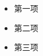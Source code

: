 \documentclass{ctexart}
\begin{document}
  \begin{itemize}
    \item 第一项
    \item 第二项
    \item 第三项
  \end{itemize}
\end{document}

